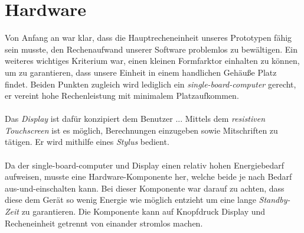 \section{Hardware}
Von Anfang an war klar, dass die Hauptrecheneinheit unseres Prototypen fähig sein musste, den Rechenaufwand unserer Software problemlos zu bewältigen. Ein weiteres wichtiges Kriterium war, einen kleinen Formfarktor einhalten zu können, um zu garantieren, dass unsere Einheit in einem handlichen Gehäuße Platz findet. Beiden Punkten zugleich wird lediglich ein \textit{single-board-computer} gerecht, er vereint hohe Rechenleistung mit minimalem Platzaufkommen.\\
\\
Das \textit{Display} ist dafür konzipiert dem Benutzer ... Mittels dem \textit{resistiven Touchscreen} ist es möglich, Berechnungen einzugeben sowie Mitschriften zu tätigen. Er wird mithilfe eines \textit{Stylus} bedient.\\
\\
Da der single-board-computer und Display einen relativ hohen Energiebedarf aufweisen, musste eine Hardware-Komponente her, welche beide je nach Bedarf aus-und-einschalten kann. Bei dieser Komponente war darauf zu achten, dass diese dem Gerät so wenig Energie wie möglich entzieht um eine lange \textit{Standby-Zeit} zu garantieren. Die Komponente kann auf Knopfdruck Display und Recheneinheit getrennt von einander stromlos machen.